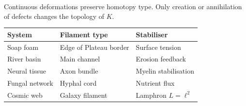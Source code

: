 \begin{proposition}
  \statusproven{}
  Continuous deformations preserve homotopy type.
  Only creation or annihilation of defects changes
  the topology of $K$.
\end{proposition}

\begin{CrossDomain}
  \begin{center}
  \begin{tabular}{@{}lll@{}}
    \toprule
    \textbf{System} & \textbf{Filament type} & \textbf{Stabiliser} \\
    \midrule
    Soap foam & Edge of Plateau border & Surface tension \\
    River basin & Main channel & Erosion feedback \\
    Neural tissue & Axon bundle & Myelin stabilisation \\
    Fungal network & Hyphal cord & Nutrient flux \\
    Cosmic web & Galaxy filament & Lamphron $L = \ell^2$ \\
    \bottomrule
  \end{tabular}
  \end{center}
\end{CrossDomain}
